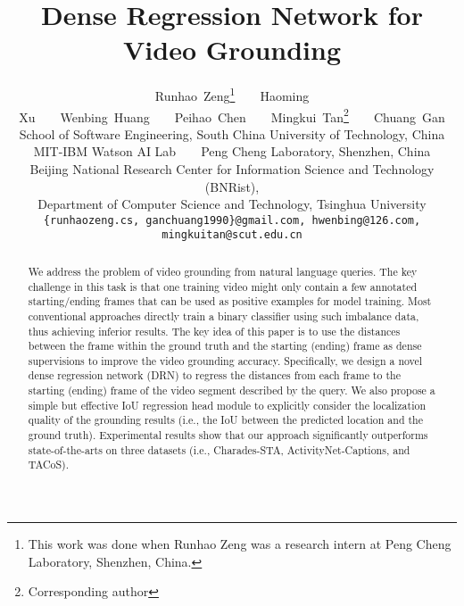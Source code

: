 \documentclass[10pt,twocolumn,letterpaper]{article}
\begin{document}
	
\title{Dense Regression Network for Video Grounding}
	
	\author{
		Runhao~Zeng\thanks{This work was done when Runhao Zeng was a research intern at Peng Cheng Laboratory, Shenzhen, China.}~~~~Haoming Xu~~~~Wenbing~Huang~~~~Peihao~Chen~~~~Mingkui~Tan\thanks{Corresponding author}~~~~Chuang~Gan\\
		School of Software Engineering, South China University of Technology, China \\ 
		MIT-IBM Watson AI Lab~~~~Peng Cheng Laboratory, Shenzhen, China \\
		Beijing National Research Center for Information Science and Technology (BNRist), \\
        Department of Computer Science and Technology, Tsinghua University\\
		{\tt\small \{runhaozeng.cs, ganchuang1990\}@gmail.com, hwenbing@126.com,
			mingkuitan@scut.edu.cn}
	}



	
\maketitle
	\pagestyle{empty}
	\thispagestyle{empty}
	




	
	











		






		




	
	





\begin{abstract}
We address the problem of video grounding from natural language queries. The key challenge in this task is that one training video might only contain a few annotated starting/ending frames that can be used as positive examples for model training. Most conventional approaches directly train a binary classifier using such imbalance data, thus achieving inferior results. The key idea of this paper is to use the distances between the frame within the ground truth and the starting (ending) frame as dense supervisions to improve the video grounding accuracy.  Specifically, we design a novel dense regression network (DRN) to regress the distances from each frame to the starting (ending) frame of the video segment described by the query.  We also propose a simple but effective IoU regression head module to explicitly consider the localization quality of the grounding results (i.e., the IoU between the predicted location and the ground truth). Experimental results show that our approach significantly outperforms state-of-the-arts on three datasets (i.e., Charades-STA, ActivityNet-Captions, and TACoS). 
\end{abstract}
\end{document}
